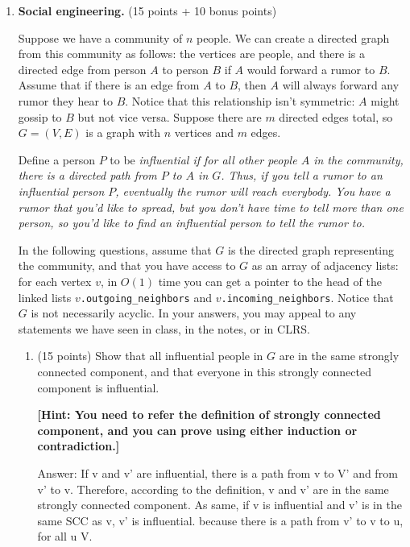 \documentclass[12pt]{article}
\begin{document}
\begin{enumerate}
{    }


  \item \textbf{Social engineering.} (15 points + 10 bonus points)

  Suppose we have a community of $n$ people.  We can create a directed graph from this community as follows: the vertices are people, and there is a directed edge from person $A$ to person $B$ if $A$ would forward a rumor to $B$. Assume that if there is an edge from $A$ to $B$, then $A$ will always forward any rumor they hear to $B$. Notice that this relationship isn't symmetric: $A$ might gossip to $B$ but not
vice versa. Suppose there are $m$ directed edges total, so $G = (V,E)$ is a graph with $n$ vertices and $m$ edges.

  Define a person $P$ to be \em influential \em if for all other people $A$ in the community, there is a directed path from $P$ to $A$ in $G$.  Thus, if you tell a rumor to an influential person $P$, eventually the rumor will reach everybody. You have a rumor that you'd like to spread, but you don't have time to tell more than one person, so you'd like to find an influential person to tell the rumor to.
  
  In the following questions, assume that $G$ is the directed graph representing the community, and that you have access to $G$ as an array of adjacency lists: for each vertex $v$, in $O(1)$ time you can get a pointer to the head of the linked lists $v$\texttt{.outgoing\_neighbors} and $v$\texttt{.incoming\_neighbors}.  Notice that $G$ is not necessarily acyclic. In your answers, you may appeal to any statements we have seen in class, in the notes, or in CLRS.
  
  \begin{enumerate}
    \item (15 points) Show that all influential people in $G$ are in the same strongly connected component, and that everyone in this strongly connected component is influential.
      
    \textbf{[Hint: You need to refer the definition of strongly connected component, and you can prove using either induction or contradiction.]}
    \\{\color{blue}Answer:\color{blue} If v and v' are influential,  there is a path from v to V' and from v' to v. Therefore, according to the definition, v and v' are in the same strongly connected component. As same, if v is influential and v' is in the same SCC as v, v' is influential. because there is a path from v' to v to u, for all u \in V. 
    
}
\end{enumerate}
\end{enumerate}
\end{document}
